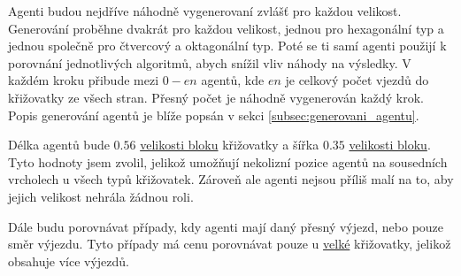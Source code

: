 Agenti budou nejdříve náhodně vygenerovaní zvlášť pro každou velikost.
Generování proběhne dvakrát pro každou velikost,
jednou pro hexagonální typ a jednou společně pro čtvercový a oktagonální typ.
Poté se ti samí agenti použijí k porovnání jednotlivých algoritmů, abych snížil vliv náhody na výsledky.
V každém kroku přibude mezi $0 - en$ agentů, kde $en$ je celkový počet vjezdů do křižovatky ze všech stran.
Přesný počet je náhodně vygenerován každý krok.
Popis generování agentů je blíže popsán v sekci \ref{subsec:generovani_agentu}.

Délka agentů bude $0.56$ \hyperref[par:velikost_bloku]{velikosti bloku} křižovatky
a šířka $0.35$ \hyperref[par:velikost_bloku]{velikosti bloku}.
Tyto hodnoty jsem zvolil, jelikož umožňují nekolizní pozice agentů na sousedních vrcholech u všech typů křižovatek.
Zároveň ale agenti nejsou příliš malí na to, aby jejich velikost nehrála žádnou roli.

Dále budu porovnávat případy, kdy agenti mají daný přesný výjezd, nebo pouze směr výjezdu.
Tyto případy má cenu porovnávat pouze u
\hyperref[par:data_velka]{velké} křižovatky, jelikož obsahuje více výjezdů.
